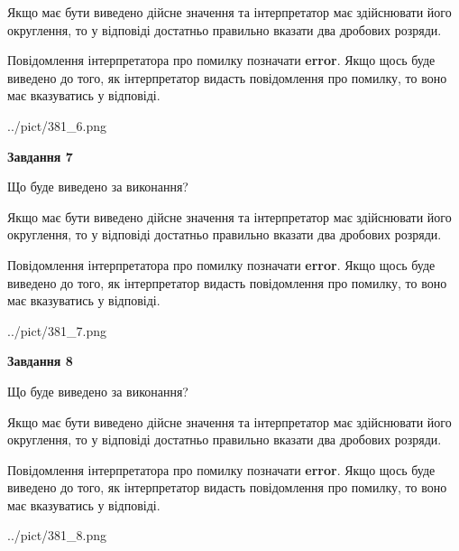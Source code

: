 \documentclass[12pt, ukrainian]{article}
\begin{document}
{\begin {Large}
Якщо має бути виведено дійсне значення та інтерпретатор має здійснювати його округлення, 
то у відповіді достатньо правильно вказати два дробових розряди.

Повідомлення інтерпретатора про помилку позначати \textbf{error}.
Якщо щось буде виведено до того, як інтерпретатор видасть повідомлення про помилку, 
то воно має вказуватись у відповіді. \par

\begin{center}
	{../pict/381_6.png}
\end{center}
\newpage

{\begin {center}\textbf{Завдання 7}\end {center}}\par
Що буде виведено за виконання? \par

Якщо має бути виведено дійсне значення та інтерпретатор має здійснювати його округлення, 
то у відповіді достатньо правильно вказати два дробових розряди.

Повідомлення інтерпретатора про помилку позначати \textbf{error}.
Якщо щось буде виведено до того, як інтерпретатор видасть повідомлення про помилку, 
то воно має вказуватись у відповіді. \par

\begin{center}
	{../pict/381_7.png}
\end{center}
\newpage

{\begin {center}\textbf{Завдання 8}\end {center}}\par
Що буде виведено за виконання? \par

Якщо має бути виведено дійсне значення та інтерпретатор має здійснювати його округлення, 
то у відповіді достатньо правильно вказати два дробових розряди.

Повідомлення інтерпретатора про помилку позначати \textbf{error}.
Якщо щось буде виведено до того, як інтерпретатор видасть повідомлення про помилку, 
то воно має вказуватись у відповіді. \par

\begin{center}
	{../pict/381_8.png}
\end{center}
\newpage


\end{Large}}
\end{document}
